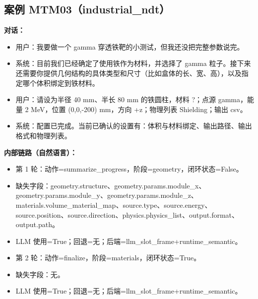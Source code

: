 \documentclass[11pt]{ctexart}
\begin{document}
\subsection{案例 MTM03（industrial\_ndt）}
\textbf{对话：}
\begin{itemize}
\item 用户：我要做一个 gamma 穿透铁靶的小测试，但我还没把完整参数说完。
\item 系统：目前我们已经确定了使用铁作为材料，并选择了 gamma 粒子。接下来还需要你提供几何结构的具体类型和尺寸（比如盒体的长、宽、高），以及指定哪个体积绑定到铁材料。
\item 用户：请设为半径 40 mm、半长 80 mm 的铁圆柱，材料 ?；点源 gamma，能量 2 MeV，位置 (0,0,-200) mm，方向 +z；物理列表 Shielding；输出 csv。
\item 系统：配置已完成。当前已确认的设置有：体积与材料绑定、输出路径、输出格式和物理列表。
\end{itemize}
\textbf{内部链路（自然语言）：}
\begin{itemize}
\item 第 1 轮：动作=summarize\_progress，阶段=geometry，闭环状态=False。
\item 缺失字段：geometry.structure、geometry.params.module\_x、geometry.params.module\_y、geometry.params.module\_z、materials.volume\_material\_map、source.type、source.energy、source.position、source.direction、physics.physics\_list、output.format、output.path。
\item LLM 使用=True；回退=无；后端=llm\_slot\_frame+runtime\_semantic。
\item 第 2 轮：动作=finalize，阶段=materials，闭环状态=True。
\item 缺失字段：无。
\item LLM 使用=True；回退=无；后端=llm\_slot\_frame+runtime\_semantic。
\end{itemize}
\end{document}
